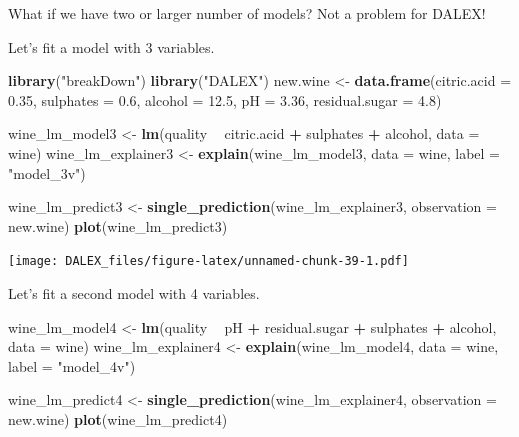 \documentclass[]{book}
\newenvironment{Shaded}{\begin{snugshade}}{\end{snugshade}}
\newcommand{\KeywordTok}[1]{\textcolor[rgb]{0.13,0.29,0.53}{\textbf{#1}}}
\newcommand{\DataTypeTok}[1]{\textcolor[rgb]{0.13,0.29,0.53}{#1}}
\newcommand{\FloatTok}[1]{\textcolor[rgb]{0.00,0.00,0.81}{#1}}
\newcommand{\StringTok}[1]{\textcolor[rgb]{0.31,0.60,0.02}{#1}}
\newcommand{\OperatorTok}[1]{\textcolor[rgb]{0.81,0.36,0.00}{\textbf{#1}}}
\newcommand{\NormalTok}[1]{#1}
\theoremstyle{definition}
\theoremstyle{definition}
\theoremstyle{definition}
\theoremstyle{remark}
\begin{document}
What if we have two or larger number of models? Not a problem for DALEX!

Let's fit a model with 3 variables.

\begin{Shaded}
\begin{Highlighting}[]
\KeywordTok{library}\NormalTok{(}\StringTok{"breakDown"}\NormalTok{)}
\KeywordTok{library}\NormalTok{(}\StringTok{"DALEX"}\NormalTok{)}
\NormalTok{new.wine <-}\StringTok{ }\KeywordTok{data.frame}\NormalTok{(}\DataTypeTok{citric.acid =} \FloatTok{0.35}\NormalTok{,}
                       \DataTypeTok{sulphates =} \FloatTok{0.6}\NormalTok{,}
                       \DataTypeTok{alcohol =} \FloatTok{12.5}\NormalTok{,}
                       \DataTypeTok{pH =} \FloatTok{3.36}\NormalTok{,}
                       \DataTypeTok{residual.sugar =} \FloatTok{4.8}\NormalTok{)}

\NormalTok{wine_lm_model3 <-}\StringTok{ }\KeywordTok{lm}\NormalTok{(quality }\OperatorTok{~}\StringTok{ }\NormalTok{citric.acid }\OperatorTok{+}\StringTok{  }\NormalTok{sulphates }\OperatorTok{+}\StringTok{ }\NormalTok{alcohol,}
                     \DataTypeTok{data =}\NormalTok{ wine)}
\NormalTok{wine_lm_explainer3 <-}\StringTok{ }\KeywordTok{explain}\NormalTok{(wine_lm_model3, }\DataTypeTok{data =}\NormalTok{ wine, }\DataTypeTok{label =} \StringTok{"model_3v"}\NormalTok{)}

\NormalTok{wine_lm_predict3 <-}\StringTok{ }\KeywordTok{single_prediction}\NormalTok{(wine_lm_explainer3, }\DataTypeTok{observation =}\NormalTok{ new.wine)}
\KeywordTok{plot}\NormalTok{(wine_lm_predict3)}
\end{Highlighting}
\end{Shaded}

\texttt{[image: DALEX\_files/figure-latex/unnamed-chunk-39-1.pdf]}

Let's fit a second model with 4 variables.

\begin{Shaded}
\begin{Highlighting}[]
\NormalTok{wine_lm_model4 <-}\StringTok{ }\KeywordTok{lm}\NormalTok{(quality }\OperatorTok{~}\StringTok{ }\NormalTok{pH }\OperatorTok{+}\StringTok{ }\NormalTok{residual.sugar }\OperatorTok{+}\StringTok{ }\NormalTok{sulphates }\OperatorTok{+}\StringTok{ }\NormalTok{alcohol,}
                     \DataTypeTok{data =}\NormalTok{ wine)}
\NormalTok{wine_lm_explainer4 <-}\StringTok{ }\KeywordTok{explain}\NormalTok{(wine_lm_model4, }\DataTypeTok{data =}\NormalTok{ wine, }\DataTypeTok{label =} \StringTok{"model_4v"}\NormalTok{)}

\NormalTok{wine_lm_predict4 <-}\StringTok{ }\KeywordTok{single_prediction}\NormalTok{(wine_lm_explainer4, }\DataTypeTok{observation =}\NormalTok{ new.wine)}
\KeywordTok{plot}\NormalTok{(wine_lm_predict4)}
\end{Highlighting}
\end{Shaded}
\end{document}

